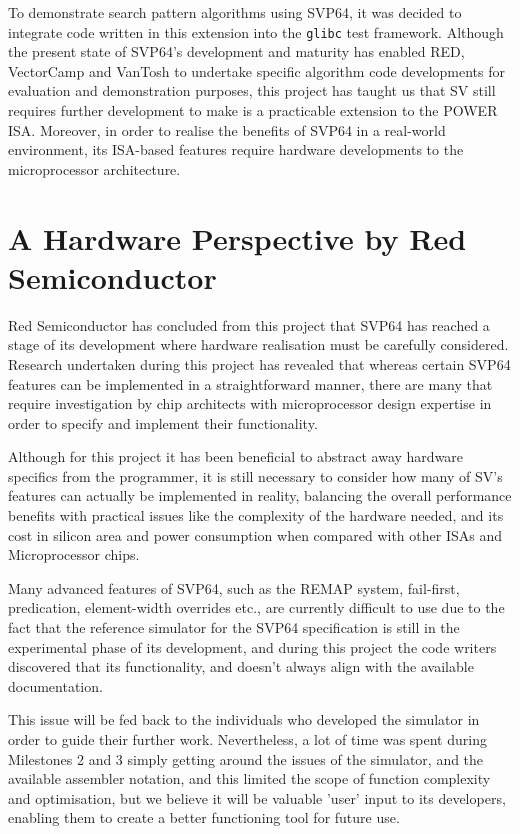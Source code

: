 To demonstrate search pattern algorithms using \acrshort{SVP64}, it was decided
to integrate code written in this extension into the \texttt{glibc}
test framework.
Although the present state of \acrshort{SVP64}'s development and maturity has enabled RED,
VectorCamp and VanTosh to undertake specific algorithm code developments for
evaluation and demonstration purposes, this project has taught us that
\acrshort{SV} still requires further development to make is a practicable
extension to the \acrshort{POWER} \acrshort{ISA}. Moreover, in order to realise the benefits of \acrshort{SVP64}
in a real-world environment, its \acrshort{ISA}-based features require hardware
developments to the microprocessor architecture.

\section{A Hardware Perspective by Red Semiconductor}

Red Semiconductor has concluded from this project that \acrshort{SVP64} has reached a
stage of its development where hardware realisation must be carefully
considered. Research undertaken during this project has revealed that whereas
certain \acrshort{SVP64} features can be implemented in a straightforward manner, there
are many that require investigation by chip architects with microprocessor
design expertise in order to specify and implement their functionality.

Although for this project it has been beneficial to abstract away hardware
specifics from the programmer, it is still necessary to consider how many of
\acrshort{SV}'s features can actually be implemented in reality,
balancing the overall performance benefits with practical issues like the
complexity of the hardware needed, and its cost in silicon area and power
consumption when compared with other ISAs and Microprocessor chips.

Many advanced features of \acrshort{SVP64}, such as the REMAP system, fail-first,
predication, element-width overrides etc., are currently difficult to use
due to the fact that the reference simulator for the \acrshort{SVP64} specification is
still in the experimental phase of its development, and during this project the
code writers discovered that its functionality, and doesn't always align with
the available documentation.

This issue will be fed back to the individuals who developed the simulator in
order to guide their further work. Nevertheless, a lot of time was spent
during Milestones 2 and 3 simply getting around the issues of the simulator,
and the available assembler notation, and this limited the scope of function
complexity and optimisation, but we believe it will be valuable 'user' input
to its developers, enabling them to create a better functioning tool
for future use.

